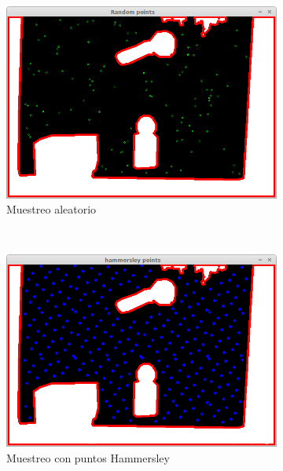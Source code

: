\begin{figure}[h]
		\centering
        \begin{subfigure}[b]{0.3\textwidth}
                \centering
                \includegraphics[width=\textwidth]{images/random-beer.png}
                \caption{Muestreo aleatorio}
                \label{fig:muestreo_aleatorio}
        \end{subfigure}
        ~
        \begin{subfigure}[b]{0.3\textwidth}
                \centering
                \includegraphics[width=\textwidth]{images/hammersley-beer.png}
                \caption{Muestreo con puntos Hammersley}
                \label{fig:muestreo_hammersley}
        \end{subfigure}
        ~
        \begin{subfigure}[b]{0.3\textwidth}

\end{subfigure}
\end{figure}
